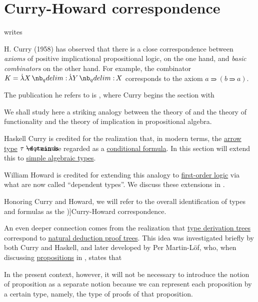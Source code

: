 \section{Curry-Howard correspondence}\label{sec:curry_howard_correspondence}

\begin{concept}\label{con:curry_howard_correspondence}
   writes
  \begin{displayquote}
    H. Curry (1958) has observed that there is a close correspondence between \textit{axioms} of positive implicational propositional logic, on the one hand, and \textit{basic combinators} on the other hand. For example, the combinator \( K = \qabs X \qabs Y X \) corresponds to the axiom \( a \rightimply (b \rightimply a) \).
  \end{displayquote}

  The publication he refers to is \cite[312]{CurryFeysCraig1958CombinatoryLogicVol1}, where Curry begins the section with
  \begin{displayquote}
    We shall study here a striking analogy between the theory of and the theory of functionality and the theory of implication in propositional algebra.
  \end{displayquote}

  Haskell Curry is credited for the realization that, in modern terms, the \hyperref[def:arrow_type]{arrow type} \( \tau \synimplies \rho \) can be regarded as a \hyperref[def:propositional_alphabet/connectives/conditional]{conditional formula}. In this section will extend this to \hyperref[def:simple_algebraic_types]{simple algebraic types}.

  William Howard is credited for extending this analogy to \hyperref[sec:first_order_logic]{first-order logic} via what are now called \enquote{dependent types}. We discuss these extensions in .

  Honoring Curry and Howard, we will refer to the overall identification of types and formulas as the \term[en=Curry-Howard correspondence (\cite[def. 4.1.7]{Mimram2020ProgramEqualsProof})]{Curry-Howard correspondence}.

  An even deeper connection comes from the realization that \hyperref[def:type_derivation_tree]{type derivation trees} correspond to \hyperref[def:natural_deduction_proof_tree]{natural deduction proof trees}. This idea was investigated briefly by both Curry and Haskell, and later developed by Per Martin-L\"of, who, when discussing \hyperref[con:proposition]{propositions} in \cite[76]{MartinLöf1975IntuitionisticTypeTheory}, states that
  \begin{displayquote}
    In the present context, however, it will not be necessary to introduce the notion of proposition as a separate notion because we can represent each proposition by a certain type, namely, the type of proofs of that proposition.
  \end{displayquote}
\end{concept}
